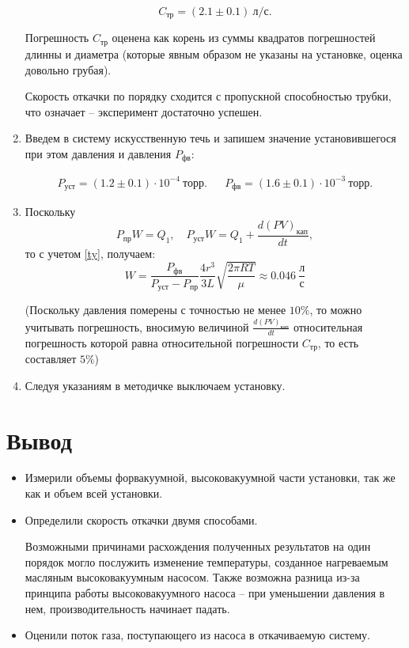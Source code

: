 \documentclass[a4paper,12pt]{article}
\theoremstyle{definition}
\begin{document}
\begin{enumerate}
		\begin{equation}
			C_{тр} = (2.1 \pm 0.1)~л / с.
		\end{equation}
		
		Погрешность $C_{тр}$  оценена как корень из суммы квадратов погрешностей длинны и диаметра (которые явным образом не указаны на установке, оценка довольно грубая).
		
		Скорость откачки по порядку сходится с пропускной способностью трубки, что означает -- эксперимент достаточно успешен.
		
		\item Введем в систему искусственную течь и запишем значение  установившегося при этом давления и давления $P_{фв}$: 
		
		\begin{align}
			P_{уст} = (1.2 \pm 0.1) \cdot 10^{-4} ~ торр. && P_{фв} = (1.6 \pm 0.1) \cdot 10^{-3} ~ торр.
		\end{align}
		
		
		\item Поскольку
		$$P_{пр} W = Q_1, \quad P_{уст} W = Q_1 + \frac{d(PV)_{кап}}{dt},$$
		то с учетом \eqref{ty}, получаем:
		\begin{equation}
			W = \frac{P_{фв}}{P_{уст}-P_{пр}}\frac{4r^3}{3L}\sqrt{\frac{2\pi RT}{\mu}} \approx 0.046~\frac{л}{с}
		\end{equation}
		
		(Поскольку давления померены с точностью не менее $10\%$, то можно учитывать погрешность, вносимую величиной $\frac{d(PV)_{кап}}{dt}$ относительная погрешность которой равна относительной погрешности $C_{тр}$, то есть составляет $5\%$)
		
		
		\item Следуя указаниям в методичке выключаем установку.
		
	\end{enumerate}
	
	\section{Вывод}
	\begin{itemize}
		\item Измерили объемы форвакуумной, высоковакуумной части установки, так же как и объем всей установки.
		
		\item Определили скорость откачки двумя способами.
		
		Возможными причинами расхождения полученных результатов на один порядок могло послужить изменение температуры, созданное нагреваемым масляным высоковакуумным насосом. Также возможна разница из-за принципа работы высоковакуумного насоса -- при уменьшении давления в нем, производительность начинает падать.
		
		\item Оценили поток газа, поступающего из насоса в откачиваемую систему.
		
		
		
		
	\end{itemize}
	
\end{document}

